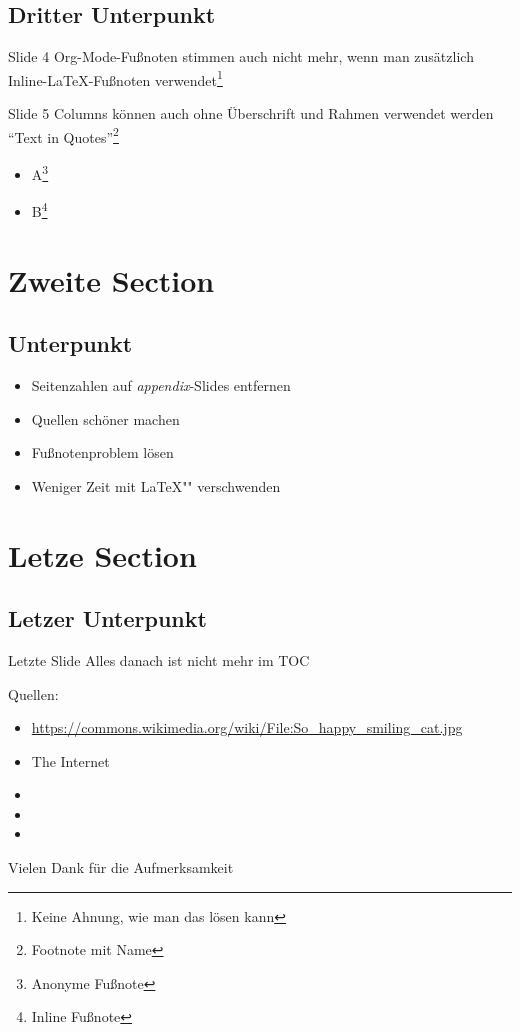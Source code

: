 \documentclass[t,compress,11pt,xcolor=dvipsnames]{beamer}
\begin{document}
\subsection{Dritter Unterpunkt}
\label{sec-1-3}
\begin{frame}[label=sec-1-3-1]{Slide 4}
Org-Mode-Fußnoten stimmen auch nicht mehr,
wenn man zusätzlich Inline-\LaTeX{}-Fußnoten verwendet\footnote{Keine Ahnung, wie man das lösen kann}
\end{frame}
\begin{frame}[label=sec-1-3-2]{Slide 5}
Columns können auch ohne Überschrift und Rahmen verwendet werden\\
     "`Text in Quotes"'\footnote{Footnote mit Name}
\begin{itemize}
\item A\footnote{Anonyme Fußnote}
\item B\footnote{Inline Fußnote}
\end{itemize}
\end{frame}
\section{Zweite Section}
\label{sec-2}
\subsection{Unterpunkt}
\label{sec-2-1}
\begin{frame}[label=sec-2-1-1]{}
\begin{itemize}
\item Seitenzahlen auf \emph{appendix}-Slides entfernen
\item Quellen schöner machen
\item Fußnotenproblem lösen
\item Weniger Zeit mit \LaTeX"" verschwenden
\end{itemize}
\end{frame}
\section{Letze Section}
\label{sec-3}
\subsection{Letzer Unterpunkt}
\label{sec-3-1}
\begin{frame}[label=sec-3-1-1]{Letzte Slide}
Alles danach ist nicht mehr im TOC
\end{frame}
\appendix
Quellen:
\tiny\begin{itemize}
\item \url{https://commons.wikimedia.org/wiki/File:So_happy_smiling_cat.jpg}
\item The Internet
\item
\item
\item
\end{itemize}
\small\centering Vielen Dank für die Aufmerksamkeit
\end{document}
